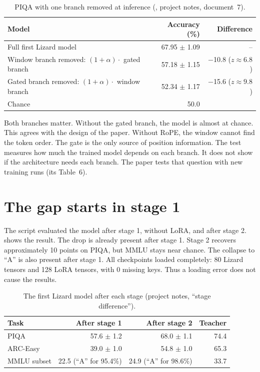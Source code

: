 \begin{table}[ht]
\centering
\small
\caption[PIQA with one branch removed at inference]{PIQA with one branch removed at inference (, project notes, document~7).}
\label{tab:ablation}
\begin{tabular}{@{}lrr@{}}
\toprule
Model & Accuracy (\%) & Difference \\
\midrule
Full first Lizard model & 67.95 $\pm$ 1.09 & -- \\
Window branch removed: $(1 + \alpha) \cdot$ gated branch & 57.18 $\pm$ 1.15 & $-$10.8 ($z \approx 6.8$) \\
Gated branch removed: $(1 + \alpha) \cdot$ window branch & 52.34 $\pm$ 1.17 & $-$15.6 ($z \approx 9.8$) \\
Chance & 50.0 & \\
\bottomrule
\end{tabular}
\end{table}

Both branches matter. Without the gated branch, the model is almost at chance. This agrees with the design of the paper. Without RoPE, the window cannot find the token order. The gate is the only source of position information. The test measures how much the trained model depends on each branch. It does not show if the architecture needs each branch. The paper tests that question with new training runs (its Table~6).

\section{The gap starts in stage 1}
\label{sec:stage-diff}

The script  evaluated the model after stage 1, without LoRA, and after stage 2.  shows the result. The drop is already present after stage 1. Stage 2 recovers approximately 10 points on PIQA, but MMLU stays near chance. The collapse to \enquote{A} is also present after stage 1. All checkpoints loaded completely: 80 Lizard tensors and 128 LoRA tensors, with 0 missing keys. Thus a loading error does not cause the results.

\begin{table}[ht]
\centering
\small
\caption[The first Lizard model after each stage]{The first Lizard model after each stage (project notes, \enquote{stage difference}).}
\label{tab:stage-diff}
\begin{tabular}{@{}lrrr@{}}
\toprule
Task & After stage 1 & After stage 2 & Teacher \\
\midrule
PIQA & 57.6 $\pm$ 1.2 & 68.0 $\pm$ 1.1 & 74.4 \\
ARC-Easy & 39.0 $\pm$ 1.0 & 54.8 $\pm$ 1.0 & 65.3 \\
MMLU subset & 22.5 (\enquote{A} for 95.4\%) & 24.9 (\enquote{A} for 98.6\%) & 33.7 \\
\bottomrule
\end{tabular}
\end{table}

